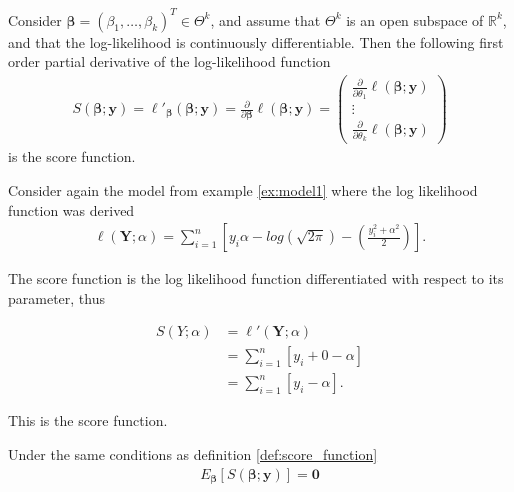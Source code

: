 \begin{definition} 
\label{def:score_function}
Consider $\boldsymbol{\beta} = (\beta_1, \ldots, \beta_k)^T \in \Theta^k$, and assume that $\Theta^k$ is an open subspace of $\mathbb{R}^k$, and that the log-likelihood is continuously differentiable. Then  the following first order partial derivative of the log-likelihood function
\begin{align*}
    S(\boldsymbol{\beta}; \textbf{y}) = \ell'_{\boldsymbol{\beta}}(\boldsymbol{\beta}; \textbf{y}) = \frac{\partial}{\partial \boldsymbol{\beta}} \ell (\boldsymbol{\beta}; \textbf{y}) = 
    \begin{pmatrix}
        \frac{\partial}{\partial \theta_1}\ell (\boldsymbol{\beta}; \textbf{y}) \\
        \vdots \\
        \frac{\partial}{\partial \theta_k}\ell (\boldsymbol{\beta}; \textbf{y})
    \end{pmatrix}
\end{align*}
is the score function.
\end{definition}

\begin{example}
Consider again the model from example \ref{ex:model1} where the log likelihood function was derived
\begin{align*}
   \ell(\textbf{Y};\alpha) = \sum_{i = 1}^n \left[y_i \alpha - log\left( \sqrt{2 \pi}\right) - \left( \frac{y_i^2 + \alpha^2}{2} \right) \right].
\end{align*}

The score function is the log likelihood function differentiated with respect to its parameter, thus

\begin{align*}
    S\left( Y\textbf{}; \alpha \right) &= \ell'(\textbf{Y}; \alpha)\\
    &= \sum_{i=1}^n \left[ y_i + 0 - \alpha \right]\\
    &= \sum_{i=1}^n \left[ y_i - \alpha \right].
\end{align*}

This is the score function.

\end{example}

\begin{theorem}
Under the same conditions as definition \ref{def:score_function}
\begin{align*}
    E_{\boldsymbol{\beta}}[S(\boldsymbol{\beta}; \textbf{y})] = \textbf{0}
\end{align*}
\end{theorem}

